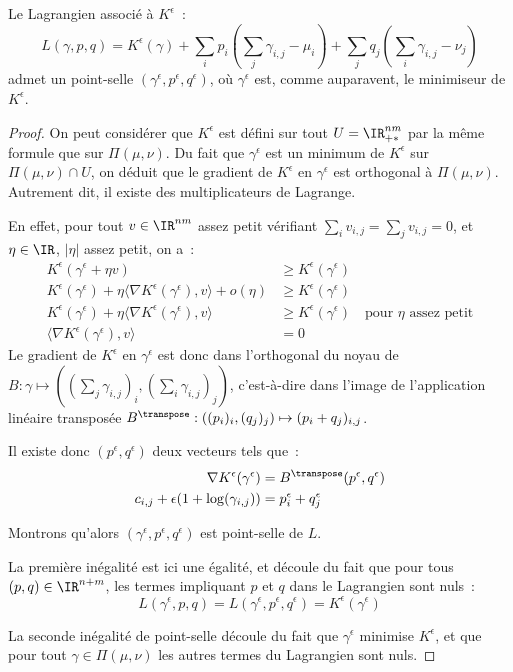 \begin{lemma}
Le Lagrangien associé à $K^\epsilon$~:
\[
L(\gamma, p, q) = K^\epsilon(\gamma) +
 \sum_i p_i \left(\sum_j \gamma_{i,j} - \mu_i\right) + 
 \sum_j q_j\left(\sum_i \gamma_{i,j} - \nu_j\right)
\]
admet un point-selle $(\gamma^\epsilon,p^\epsilon,q^\epsilon)$, où $\gamma^\epsilon$ est, comme auparavent, le minimiseur de $K^\epsilon$.
\end{lemma}
\begin{proof}
On peut considérer que $K^\epsilon$ est défini sur tout $U = \IR_{+*}^{nm}$ par la même formule que sur $\Pi(\mu,\nu)$. Du fait que $\gamma^\epsilon$ est un minimum de $K^\epsilon$ sur $\Pi(\mu,\nu) \cap U$, on déduit que le gradient de $K^\epsilon$ en $\gamma^\epsilon$ est orthogonal à $\Pi(\mu,\nu)$. Autrement dit, il existe des multiplicateurs de Lagrange.

En effet, pour tout $v \in \IR^{nm}$ assez petit vérifiant $\sum_i v_{i,j} = \sum_j v_{i,j} = 0$, et $\eta \in \IR$, $|\eta|$ assez petit, on a~:
\[ \begin{split}
K^\epsilon(\gamma^\epsilon + \eta v) &\ge K^\epsilon(\gamma^\epsilon) \\
K^\epsilon(\gamma^\epsilon) + \eta \langle \nabla K^\epsilon(\gamma^\epsilon) , v \rangle + o(\eta)  &\ge K^\epsilon(\gamma^\epsilon) \\
K^\epsilon(\gamma^\epsilon) + \eta \langle \nabla K^\epsilon(\gamma^\epsilon) , v \rangle &\ge K^\epsilon(\gamma^\epsilon) \quad \text{pour $\eta$ assez petit} \\
\langle \nabla K^\epsilon(\gamma^\epsilon) , v \rangle &= 0
\end{split}\]
Le gradient de $K^\epsilon$ en $\gamma^\epsilon$ est donc dans l'orthogonal du noyau de $B : \gamma \mapsto ((\sum_j \gamma_{i,j})_i, (\sum_i \gamma_{i,j})_j)$, c'est-à-dire dans l'image de l'application linéaire transposée $B^\transpose : ((p_i)_i,(q_j)_j) \mapsto (p_i+q_j)_{i,j}$.

Il existe donc $(p^\epsilon,q^\epsilon)$ deux vecteurs tels que~:
\[\begin{split}
\nabla K^\epsilon(\gamma^\epsilon) &= B^\transpose (p^\epsilon,q^\epsilon)  \\
c_{i,j} + \epsilon (1+\log(\gamma_{i,j})) &= p^\epsilon_i + q^\epsilon_j
\end{split}\]

Montrons qu'alors $(\gamma^\epsilon,p^\epsilon,q^\epsilon)$ est point-selle de $L$.

La première inégalité est ici une égalité, et découle du fait que pour tous $(p,q) \in \IR^{n+m}$, les termes impliquant $p$ et $q$ dans le Lagrangien sont nuls~:
\[ L(\gamma^\epsilon,p,q) = L(\gamma^\epsilon,p^\epsilon,q^\epsilon) = K^\epsilon(\gamma^\epsilon) \]

La seconde inégalité de point-selle découle du fait que $\gamma^\epsilon$ minimise $K^\epsilon$, et que pour tout $\gamma \in \Pi(\mu,\nu)$ les autres termes du Lagrangien sont nuls.
\end{proof}


